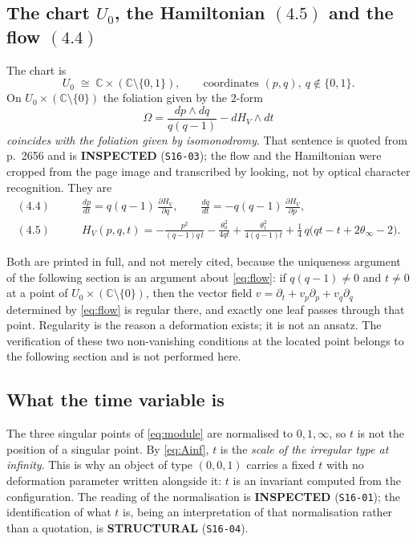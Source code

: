 \subsection{The chart \texorpdfstring{$U_0$}{U0}, the Hamiltonian
\texorpdfstring{$(4.5)$}{(4.5)} and the flow
\texorpdfstring{$(4.4)$}{(4.4)}}\label{ssec:flow}

The chart is
\begin{equation}\label{eq:chart}
  U_0\;\cong\;\mathbb C\times(\mathbb C\setminus\{0,1\}),
  \qquad\text{coordinates }(p,q),\ q\notin\{0,1\}.
\end{equation}
On $U_0\times(\mathbb C\setminus\{0\})$ the foliation given by the $2$-form
\begin{equation}\label{eq:omega}
  \Omega=\frac{dp\wedge dq}{q(q-1)}-dH_V\wedge dt
\end{equation}
\emph{coincides with the foliation given by isomonodromy}. That sentence is
quoted from p.~2656 and is \textbf{INSPECTED} (\texttt{S16-03}); the flow and
the Hamiltonian were cropped from the page image and transcribed by looking,
not by optical character recognition. They are
\begin{align}
  (4.4)\qquad
  &\frac{dp}{dt}=q(q-1)\,\frac{\partial H_V}{\partial q},
   \qquad
   \frac{dq}{dt}=-q(q-1)\,\frac{\partial H_V}{\partial p},
   \label{eq:flow}\\[4pt]
  (4.5)\qquad
  &H_V(p,q,t)=-\frac{p^2}{(q-1)q\,t}
     -\frac{\theta_0^2}{4qt}
     +\frac{\theta_1^2}{4(q-1)t}
     +\tfrac14\,q\bigl(qt-t+2\theta_\infty-2\bigr).
   \label{eq:HV}
\end{align}

Both are printed in full, and not merely cited, because the uniqueness argument
of the following section is an argument about \eqref{eq:flow}: if
$q(q-1)\neq0$ and $t\neq0$ at a point of $U_0\times(\mathbb C\setminus\{0\})$,
then the vector field
$v=\partial_t+v_p\partial_p+v_q\partial_q$ determined by \eqref{eq:flow} is
regular there, and exactly one leaf passes through that point. Regularity is
the reason a deformation exists; it is not an ansatz. The verification of
these two non-vanishing conditions at the located point belongs to the
following section and is not performed here.

\subsection{What the time variable is}\label{ssec:time}

The three singular points of \eqref{eq:module} are normalised to $0,1,\infty$,
so $t$ is not the position of a singular point. By \eqref{eq:Ainf}, $t$ is the
\emph{scale of the irregular type at infinity}. This is why an object of type
$(0,0,1)$ carries a fixed $t$ with no deformation parameter written alongside
it: $t$ is an invariant computed from the configuration. The reading of the
normalisation is \textbf{INSPECTED} (\texttt{S16-01}); the identification of
what $t$ is, being an interpretation of that normalisation rather than a
quotation, is \textbf{STRUCTURAL} (\texttt{S16-04}).

